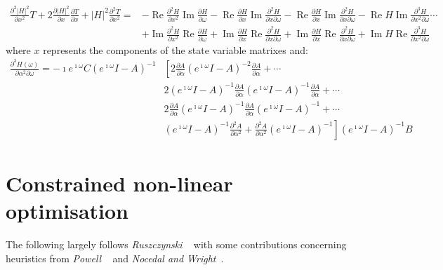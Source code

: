 \documentclass[a4paper,twoside,10pt,english]{report}
\begin{document}
\begin{align*}
\frac{\partial^{2}\left|H\right|^{2}}{\partial{}x^{2}}T +
2\frac{\partial\left|H\right|^{2}}{\partial{}x}\frac{\partial{}T}{\partial{}x} +
\left|H\right|^{2}\frac{\partial^{2}T}{\partial{}x^{2}}=&
-\operatorname{Re}\frac{\partial^{2}H}{\partial{}x^{2}}
\operatorname{Im}\frac{\partial{}H}{\partial\omega} -
\operatorname{Re}\frac{\partial{}H}{\partial{}x}
\operatorname{Im}\frac{\partial^{2}H}{\partial{}x\partial\omega} -
\operatorname{Re}\frac{\partial{}H}{\partial{}x}
\operatorname{Im}\frac{\partial^{2}H}{\partial{}x\partial\omega} -
\operatorname{Re}H
\operatorname{Im}\frac{\partial^{3}H}{\partial{}x^{2}\partial\omega} \cdots\\
&+\operatorname{Im}\frac{\partial^{2}H}{\partial{}x^{2}}
\operatorname{Re}\frac{\partial{}H}{\partial\omega} +
\operatorname{Im}\frac{\partial{}H}{\partial{}x}
\operatorname{Re}\frac{\partial^{2}H}{\partial{}x\partial\omega} +
\operatorname{Im}\frac{\partial{}H}{\partial{}x}
\operatorname{Re}\frac{\partial^{2}H}{\partial{}x\partial\omega} +
\operatorname{Im}H
\operatorname{Re}\frac{\partial^{3}H}{\partial{}x^{2}\partial\omega}
\end{align*}
where $x$ represents the components of the state variable matrixes and:
\begin{align*}
\frac{\partial^{3}H\left(\omega\right)}{\partial\alpha^{2}\partial{}\omega}=
-\imath{}e^{\imath\omega}C\left(e^{\imath\omega}I-A\right)^{-1}&\left[
2\frac{\partial{}A}{\partial\alpha}
\left(e^{\imath\omega}I-A\right)^{-2}
\frac{\partial{}A}{\partial\alpha}+ \cdots\right.\\
&\left. 2\left(e^{\imath\omega}I-A\right)^{-1}
\frac{\partial{}A}{\partial\alpha}
\left(e^{\imath\omega}I-A\right)^{-1}
\frac{\partial{}A}{\partial\alpha}+ \cdots\right.\\
&\left. 2\frac{\partial{}A}{\partial\alpha}
\left(e^{\imath\omega}I-A\right)^{-1}
\frac{\partial{}A}{\partial\alpha}
\left(e^{\imath\omega}I-A\right)^{-1}+ \cdots\right.\\
&\left. \left(e^{\imath\omega}I-A\right)^{-1}
\frac{\partial^{2}A}{\partial\alpha^{2}}+
\frac{\partial^{2}A}{\partial\alpha^{2}}
\left(e^{\imath\omega}I-A\right)^{-1}
\right]\left(e^{\imath\omega}I-A\right)^{-1}B
\end{align*}

\cleardoublepage{}
\chapter{\label{app:Constrained-Non-linear-Optimisation}Constrained non-linear optimisation}
The following largely follows \emph{Ruszczynski} 
~\cite{Ruszczynski_NonlinearOptimization} with some contributions concerning 
heuristics from \emph{Powell}
~\cite{Powell_FastNonlinearConstrainedOptimization} and 
\emph{Nocedal and Wright}~\cite{NocedalWright_NumericalOptimization}.
\end{document}
